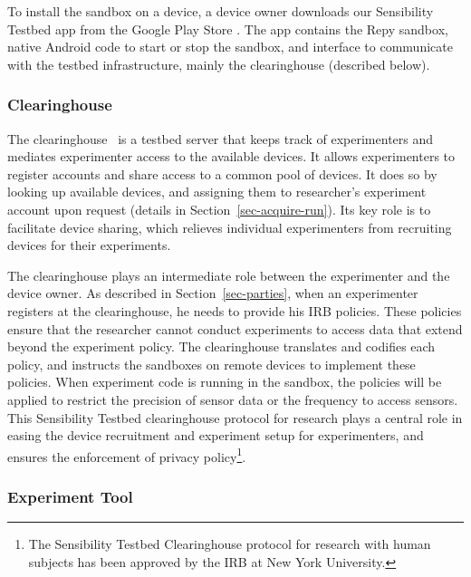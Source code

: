 To install the sandbox on a device, a device owner downloads 
our Sensibility Testbed app from the Google Play Store \cite{sensibility-app}.
The app contains the Repy sandbox, native Android code to 
start or stop the sandbox, and interface to communicate with the testbed 
infrastructure, mainly the clearinghouse (described below).

\subsubsection{Clearinghouse}\label{sec-ch}
The clearinghouse~\cite{ch} is a testbed server that keeps track of 
experimenters and mediates experimenter access to the 
available devices. It allows experimenters to register 
accounts and share access to a common pool of devices.
It does so by looking up available devices, and assigning
them to researcher's experiment account upon request 
(details in Section~\ref{sec-acquire-run}). 
Its key role is to facilitate device sharing, 
which relieves individual experimenters from recruiting 
devices for their experiments.

The clearinghouse
plays an intermediate role between the experimenter and 
the device owner.
As described in Section~\ref{sec-parties}, when an 
experimenter registers at the clearinghouse, he
needs to provide his IRB policies. These policies ensure that
the researcher cannot conduct experiments to access data that
extend beyond the experiment policy. The clearinghouse 
translates and codifies each policy, and instructs the 
sandboxes on remote devices to implement these policies. 
When experiment code is running in the sandbox, the 
policies will be applied to restrict the precision of sensor 
data or the frequency to access sensors. This Sensibility Testbed
clearinghouse protocol for research plays a central role in
easing the device recruitment and experiment setup for experimenters, 
and ensures the enforcement
of privacy policy\footnote{The Sensibility Testbed Clearinghouse
protocol for research with human subjects has been approved by
the IRB at New York University. }. 

\subsubsection{Experiment Tool}\label{sec-emt}

